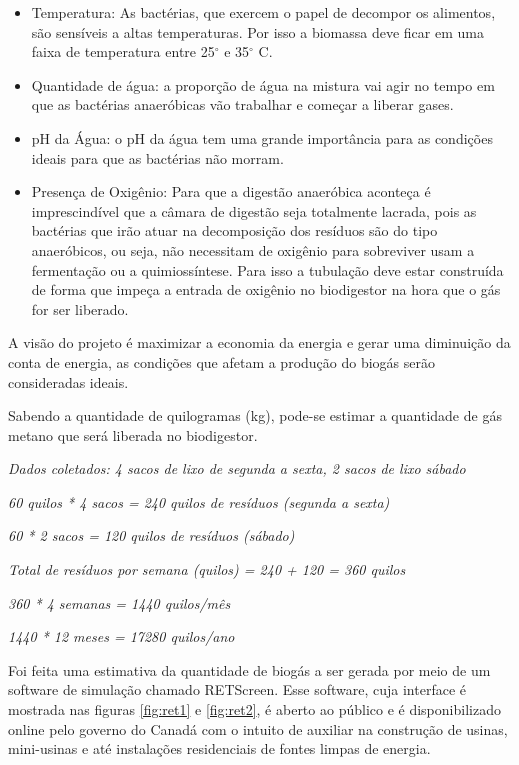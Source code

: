 \begin{itemize}
        \item Temperatura: As bactérias, que exercem o papel de decompor os alimentos, são sensíveis a altas temperaturas. Por isso a biomassa deve ficar em uma faixa de temperatura entre 25$^{\circ}$ e 35$^{\circ}$ C.
        \item Quantidade de água: a proporção de água na mistura vai agir no tempo em que as bactérias anaeróbicas vão trabalhar e começar a liberar gases.
        \item pH da Água: o pH da água tem uma grande importância para as condições ideais para que as bactérias não morram.
        \item Presença de Oxigênio: Para que a digestão anaeróbica aconteça é imprescindível que a câmara de digestão seja totalmente lacrada, pois as bactérias que irão atuar na decomposição dos resíduos são do tipo anaeróbicos, ou seja, não necessitam de oxigênio para sobreviver usam a fermentação ou a quimiossíntese. Para isso a tubulação deve estar construída de forma que impeça a entrada de oxigênio no biodigestor na hora que o gás for ser liberado.
\end{itemize}

A visão do projeto é maximizar a economia da energia e gerar uma diminuição da conta de energia, as condições que afetam a produção do biogás serão consideradas ideais.

Sabendo a quantidade de quilogramas (kg), pode-se estimar a quantidade de gás metano que será liberada no biodigestor.\newline

\centerline{\textit{Dados coletados: 4 sacos de lixo de segunda a sexta, 2 sacos de lixo sábado}}
\centerline{\textit{60 quilos * 4 sacos = 240 quilos de resíduos (segunda a sexta)}}
\centerline{\textit{60 * 2 sacos = 120 quilos de resíduos (sábado)}}
\centerline{\textit{Total de resíduos por semana (quilos) = 240 + 120 = 360 quilos}}
\centerline{\textit{360 * 4 semanas = 1440 quilos/mês}}
\centerline{\textit{1440 * 12 meses = 17280 quilos/ano}}


Foi feita uma estimativa da quantidade de biogás a ser gerada por meio de um software de simulação chamado RETScreen. Esse software, cuja interface é mostrada nas figuras \ref{fig:ret1} e \ref{fig:ret2}, é aberto ao público e é disponibilizado online pelo governo do Canadá com o intuito de auxiliar na construção de usinas, mini-usinas e até instalações residenciais de fontes limpas de energia.

